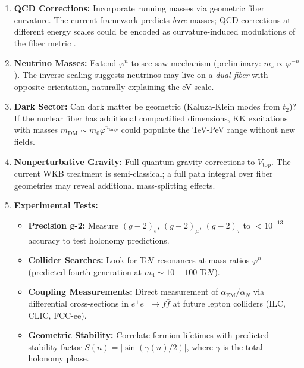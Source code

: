 \documentclass[12pt]{article}
\begin{document}
\begin{enumerate}
\item \textbf{QCD Corrections:} Incorporate running masses via geometric fiber curvature. The current framework predicts \textit{bare} masses; QCD corrections at different energy scales could be encoded as curvature-induced modulations of the fiber metric \cite{vogt2004threeloop}.

\item \textbf{Neutrino Masses:} Extend $\varphi^n$ to see-saw mechanism (preliminary: $m_\nu \propto \varphi^{-n}$). The inverse scaling suggests neutrinos may live on a \textit{dual fiber} with opposite orientation, naturally explaining the eV scale.

\item \textbf{Dark Sector:} Can dark matter be geometric (Kaluza-Klein modes from $t_2$)? If the nuclear fiber has additional compactified dimensions, KK excitations with masses $m_{\text{DM}} \sim m_0 \varphi^{n_{\text{large}}}$ could populate the TeV-PeV range without new fields.

\item \textbf{Nonperturbative Gravity:} Full quantum gravity corrections to $V_{\text{top}}$. The current WKB treatment is semi-classical; a full path integral over fiber geometries may reveal additional mass-splitting effects.

\item \textbf{Experimental Tests:} 
    \begin{itemize}
    \item \textbf{Precision g-2:} Measure $(g-2)_e$, $(g-2)_\mu$, $(g-2)_\tau$ to $< 10^{-13}$ accuracy to test holonomy predictions.
    \item \textbf{Collider Searches:} Look for TeV resonances at mass ratios $\varphi^n$ (predicted fourth generation at $m_4 \sim 10-100$ TeV).
    \item \textbf{Coupling Measurements:} Direct measurement of $\alpha_{\text{EM}}/\alpha_N$ via differential cross-sections in $e^+e^- \to f\bar{f}$ at future lepton colliders (ILC, CLIC, FCC-ee).
    \item \textbf{Geometric Stability:} Correlate fermion lifetimes with predicted stability factor $S(n) = |\sin(\gamma(n)/2)|$, where $\gamma$ is the total holonomy phase.
    \end{itemize}


\end{enumerate}
\end{document}
